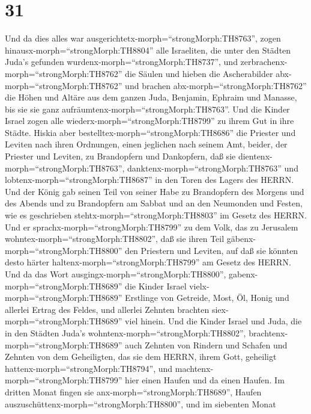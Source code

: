 \hypertarget{section-30}{%
\section{31}\label{section-30}}

 Und da dies alles war
ausgerichtetx-morph=``strongMorph:TH8763'', zogen
hinausx-morph=``strongMorph:TH8804'' alle Israeliten, die unter den
Städten Juda's gefunden wurdenx-morph=``strongMorph:TH8737'', und
zerbrachenx-morph=``strongMorph:TH8762'' die Säulen und hieben die
Ascherabilder abx-morph=``strongMorph:TH8762'' und brachen
abx-morph=``strongMorph:TH8762'' die Höhen und Altäre aus dem ganzen
Juda, Benjamin, Ephraim und Manasse, bis sie sie ganz
aufräumtenx-morph=``strongMorph:TH8763''. Und die Kinder Israel zogen
alle wiederx-morph=``strongMorph:TH8799'' zu ihrem Gut in ihre Städte.
 Hiskia aber bestelltex-morph=``strongMorph:TH8686'' die
Priester und Leviten nach ihren Ordnungen, einen jeglichen nach seinem
Amt, beider, der Priester und Leviten, zu Brandopfern und Dankopfern,
daß sie dientenx-morph=``strongMorph:TH8763'',
danktenx-morph=``strongMorph:TH8763'' und
lobtenx-morph=``strongMorph:TH8687'' in den Toren des Lagers des HERRN.
 Und der König gab seinen Teil von seiner Habe zu
Brandopfern des Morgens und des Abends und zu Brandopfern am Sabbat und
an den Neumonden und Festen, wie es geschrieben
stehtx-morph=``strongMorph:TH8803'' im Gesetz des HERRN. 
Und er sprachx-morph=``strongMorph:TH8799'' zu dem Volk, das zu
Jerusalem wohntex-morph=``strongMorph:TH8802'', daß sie ihren Teil
gäbenx-morph=``strongMorph:TH8800'' den Priestern und Leviten, auf daß
sie könnten desto härter haltenx-morph=``strongMorph:TH8799'' am Gesetz
des HERRN.  Und da das Wort
ausgingx-morph=``strongMorph:TH8800'',
gabenx-morph=``strongMorph:TH8689'' die Kinder Israel
vielx-morph=``strongMorph:TH8689'' Erstlinge von Getreide, Most, Öl,
Honig und allerlei Ertrag des Feldes, und allerlei Zehnten brachten
siex-morph=``strongMorph:TH8689'' viel hinein.  Und die
Kinder Israel und Juda, die in den Städten Juda's
wohntenx-morph=``strongMorph:TH8802'',
brachtenx-morph=``strongMorph:TH8689'' auch Zehnten von Rindern und
Schafen und Zehnten von dem Geheiligten, das sie dem HERRN, ihrem Gott,
geheiligt hattenx-morph=``strongMorph:TH8794'', und
machtenx-morph=``strongMorph:TH8799'' hier einen Haufen und da einen
Haufen.  Im dritten Monat fingen sie
anx-morph=``strongMorph:TH8689'', Haufen
auszuschüttenx-morph=``strongMorph:TH8800'', und im siebenten Monat
